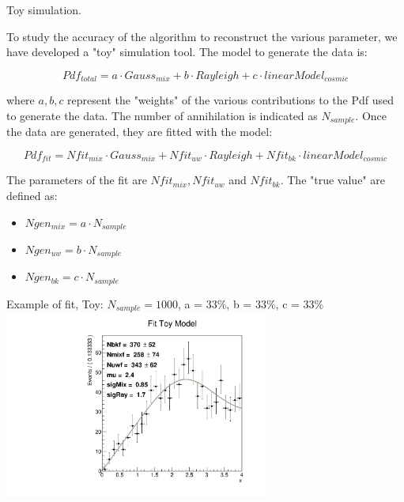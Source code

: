 \documentclass[9pt]{beamer}
\begin{document}
\begin{frame}[t]{Toy simulation.}

To study the accuracy of the algorithm to reconstruct the various parameter, we have developed a "toy" simulation tool. The model to generate the data is:

\begin{equation}
Pdf_{total} = a \cdot Gauss_{mix} + b \cdot Rayleigh + c \cdot linearModel_{cosmic} 
\end{equation}

where $a,b,c$ represent the "weights" of the various contributions to the Pdf used to generate the data. The number of annihilation is indicated as $N_{sample}$. Once the data are generated, they are fitted with the model:

\begin{equation}
Pdf_{fit} = Nfit_{mix} \cdot Gauss_{mix} + Nfit_{uw} \cdot Rayleigh + Nfit_{bk} \cdot linearModel_{cosmic}
\end{equation}

The parameters of the fit are $Nfit_{mix}, Nfit_{uw}$ and $Nfit_{bk}$. The "true value" are defined as:

\begin{itemize}
\centering
\item $Ngen_{mix} = a \cdot N_{sample}$
\item $Ngen_{uw}  = b \cdot N_{sample}$
\item $Ngen_{bk}  = c \cdot N_{sample}$
\end{itemize} 
\end{frame}

\begin{frame}{Example of fit, Toy: $N_{sample} = 1000$, a = $33\%$, b = $33\%$, c = $33\%$}
\includegraphics[width = 0.65\textwidth , left]{N1000/FitToy(33,33,33).pdf} 
\end{frame}
\end{document}
